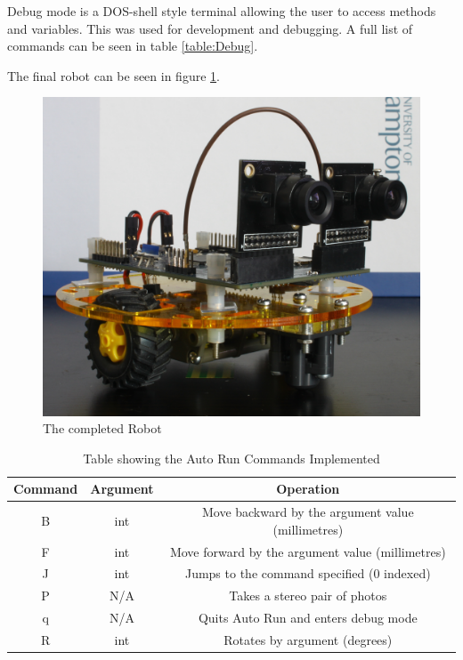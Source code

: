 Debug mode is a DOS-shell style terminal allowing the user to access methods and variables. This was used for development and debugging. A full list of commands can be seen in table \ref{table:Debug}. 

The final robot can be seen in figure \ref{fig:Robot:Complete}.

\begin{figure}
\includegraphics[width=\textwidth]{Figures/Robot.jpg}
\caption{The completed Robot}
\label{fig:Robot:Complete}
\end{figure}

\begin{table}
\centering
\caption{Table showing the Auto Run Commands Implemented}
\label{table:AutoRun}
\begin{tabular}{ccc}\toprule
Command & 	Argument 			& 	Operation \\\toprule
B		&	int					&	Move backward by the argument value (millimetres) \\\midrule
F		&	int 				&	Move forward by the argument value (millimetres)\\\midrule
J		&	int					&	Jumps to the command specified (0 indexed)\\\midrule
P		&	N/A					&	Takes a stereo pair of photos\\\midrule
q		&	N/A					&	Quits Auto Run and enters debug mode\\\midrule
R		& 	int 			 	&	Rotates by argument (degrees)\\ \bottomrule
\end{tabular}
\end{table}

